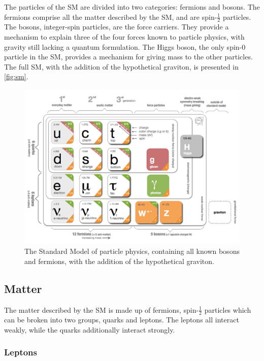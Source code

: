 The particles of the \ac{SM} are divided into two categories: fermions and bosons. The fermions comprise all the matter described by the \ac{SM}, and are spin-$\frac{1}{2}$ particles. The bosons, integer-spin particles, are the force carriers. They provide a mechanism to explain three of the four forces known to particle physics, with gravity still lacking a quantum formulation. The Higgs boson, the only spin-0 particle in the \ac{SM}, provides a mechanism for giving mass to the other particles. The full \ac{SM}, with the addition of the hypothetical graviton, is presented in \autoref{fig:sm}. 

\begin{centering}
\begin{figure}[bth]
\myfloatalign
\includegraphics[width=.85\linewidth]{figures/theory/standardmodel.png}
\caption{The Standard Model of particle physics, containing all known bosons and fermions, with the addition of the hypothetical graviton. \cite{Galbraith:2012}}
\label{fig:sm}
\end{figure}
\end{centering}

\subsection{Matter}
\label{sec:matter}

The matter described by the \ac{SM} is made up of fermions, spin-$\frac{1}{2}$ particles which can be broken into two groups, quarks and leptons. The leptons all interact weakly, while the quarks additionally interact strongly. 

\subsubsection{Leptons}

